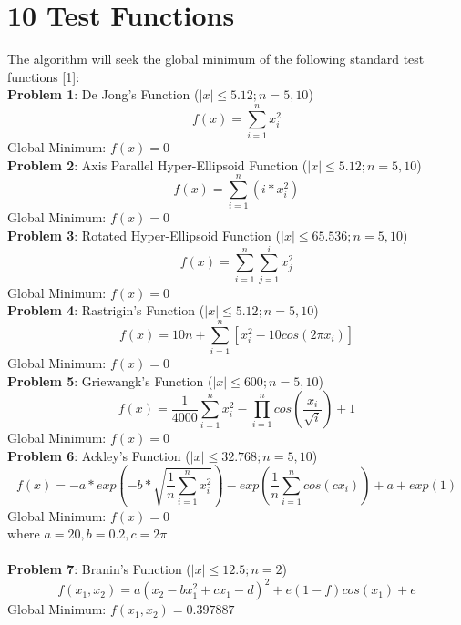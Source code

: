 \documentclass{article}
\begin{document}
\section{10 Test Functions}
The algorithm will seek the global minimum of the following standard test functions [1]:\\
\textbf{Problem 1}: De Jong's Function ($|x| \leq 5.12; n=5,10$)
\begin{equation}
f(x) = \sum^n_{i=1}x_i^2
\end{equation}
Global Minimum: $f(x) = 0$\\
\textbf{Problem 2}: Axis Parallel Hyper-Ellipsoid Function ($|x| \leq 5.12; n=5,10$)
\begin{equation}
f(x) = \sum^n_{i=1}(i*x_i^2)
\end{equation}
Global Minimum: $f(x) = 0$\\
\textbf{Problem 3}: Rotated Hyper-Ellipsoid Function ($|x| \leq 65.536; n=5,10$)
\begin{equation}
f(x) = \sum^n_{i=1}\sum^i_{j=1}x_j^2
\end{equation}
Global Minimum: $f(x) = 0$\\
\textbf{Problem 4}: Rastrigin's Function ($|x| \leq 5.12; n=5,10$)
\begin{equation}
f(x) = 10n + \sum^n_{i=1}[x_i^2 - 10cos(2\pi x_i)]
\end{equation}
Global Minimum: $f(x) = 0$\\
\textbf{Problem 5}: Griewangk's Function ($|x| \leq 600; n=5,10$)
\begin{equation}
f(x) = \frac{1}{4000}\sum^n_{i=1}x_i^2 - \prod^n_{i=1}cos(\frac{x_i}{\sqrt{i}}) + 1
\end{equation}
Global Minimum: $f(x) = 0$\\
\textbf{Problem 6}: Ackley's Function ($|x| \leq 32.768; n=5,10$)
\begin{equation}
f(x) = -a*exp(-b*\sqrt{\frac{1}{n}\sum^n_{i=1}x_i^2}) - exp(\frac{1}{n}\sum^n_{i=1}cos(cx_i)) + a + exp(1)
\end{equation}
Global Minimum: $f(x) = 0$\\
where $a=20, b=0.2, c = 2\pi$\\\\
\textbf{Problem 7}: Branin's Function ($|x| \leq 12.5; n=2$)
\begin{equation}
f(x_1,x_2) = a(x_2 - bx^2_1 + cx_1 - d)^2 + e(1 - f)cos(x_1) + e
\end{equation}
Global Minimum: $f(x_1,x_2) = 0.397887$\\
\end{document}
